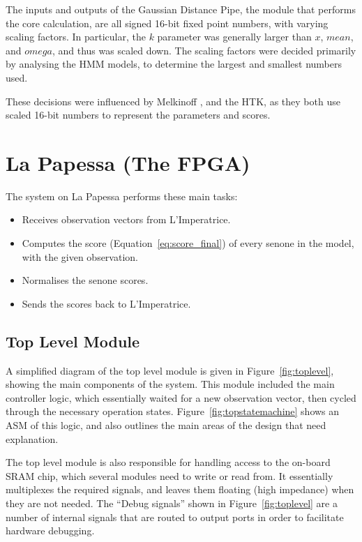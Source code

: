 	The inputs and outputs of the Gaussian Distance Pipe, the module that performs the core calculation, are all signed 16-bit fixed point numbers, with varying scaling factors.  In particular, the $k$ parameter was generally larger than $x$, $mean$, and $omega$, and thus was scaled down.  The scaling factors were decided primarily by analysing the HMM models, to determine the largest and smallest numbers used.

	These decisions were influenced by Melkinoff \cite{melnikoff2003speech}, and the HTK, as they both use scaled 16-bit numbers to represent the parameters and scores.


\section{La Papessa (The FPGA)} %
\label{sec:la_papessa_fpga}

	The system on La Papessa performs these main tasks:
	\begin{itemize}
		\item Receives observation vectors from L'Imperatrice.
		\item Computes the score (Equation~\ref{eq:score_final}) of every senone in the model, with the given observation.
		\item Normalises the senone scores.
		\item Sends the scores back to L'Imperatrice.
	\end{itemize}

	\subsection{Top Level Module} %
	\label{sub:top_level_module}
		A simplified diagram of the top level module is given in Figure~\ref{fig:toplevel}, showing the main components of the system.  This module included the main controller logic, which essentially waited for a new observation vector, then cycled through the necessary operation states.  Figure~\ref{fig:topstatemachine} shows an ASM of this logic, and also outlines the main areas of the design that need explanation.

		The top level module is also responsible for handling access to the on-board SRAM chip, which several modules need to write or read from.  It essentially multiplexes the required signals, and leaves them floating (high impedance) when they are not needed.  The ``Debug signals'' shown in Figure~\ref{fig:toplevel} are a number of internal signals that are routed to output ports in order to facilitate hardware debugging.

